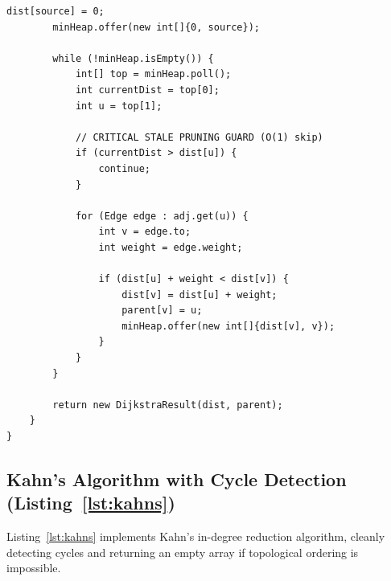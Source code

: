 \documentclass[10pt,journal,compsoc,onecolumn]{IEEEtran}
\begin{document}
\begin{lstlisting}[caption={Production Dijkstra with Lazy Deletion and Path Reconstruction}, label={lst:dijkstra}]
        dist[source] = 0;
        minHeap.offer(new int[]{0, source});

        while (!minHeap.isEmpty()) {
            int[] top = minHeap.poll();
            int currentDist = top[0];
            int u = top[1];

            // CRITICAL STALE PRUNING GUARD (O(1) skip)
            if (currentDist > dist[u]) {
                continue;
            }

            for (Edge edge : adj.get(u)) {
                int v = edge.to;
                int weight = edge.weight;

                if (dist[u] + weight < dist[v]) {
                    dist[v] = dist[u] + weight;
                    parent[v] = u;
                    minHeap.offer(new int[]{dist[v], v});
                }
            }
        }

        return new DijkstraResult(dist, parent);
    }
}
\end{lstlisting}

\subsection{Kahn's Algorithm with Cycle Detection (Listing~\ref{lst:kahns})}
Listing~\ref{lst:kahns} implements Kahn's in-degree reduction algorithm, cleanly detecting cycles and returning an empty array if topological ordering is impossible.
\end{document}
